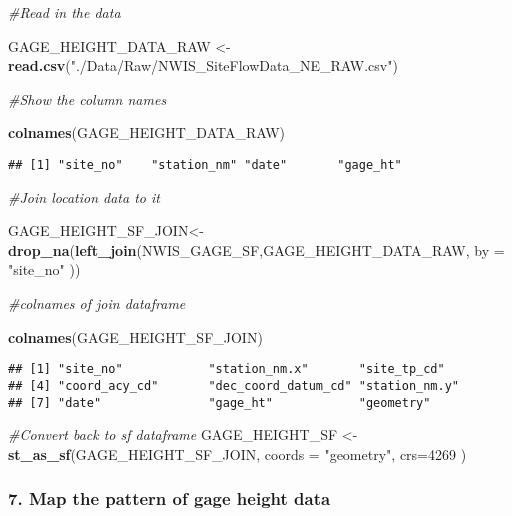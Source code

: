 \documentclass[]{article}
\newenvironment{Shaded}{\begin{snugshade}}{\end{snugshade}}
\newcommand{\KeywordTok}[1]{\textcolor[rgb]{0.13,0.29,0.53}{\textbf{#1}}}
\newcommand{\DataTypeTok}[1]{\textcolor[rgb]{0.13,0.29,0.53}{#1}}
\newcommand{\DecValTok}[1]{\textcolor[rgb]{0.00,0.00,0.81}{#1}}
\newcommand{\StringTok}[1]{\textcolor[rgb]{0.31,0.60,0.02}{#1}}
\newcommand{\CommentTok}[1]{\textcolor[rgb]{0.56,0.35,0.01}{\textit{#1}}}
\newcommand{\NormalTok}[1]{#1}
\begin{document}
\begin{Shaded}
\begin{Highlighting}[]
\CommentTok{#Read in the data}

\NormalTok{GAGE_HEIGHT_DATA_RAW <-}\StringTok{ }\KeywordTok{read.csv}\NormalTok{(}\StringTok{"./Data/Raw/NWIS_SiteFlowData_NE_RAW.csv"}\NormalTok{)}

\CommentTok{#Show the column names}

\KeywordTok{colnames}\NormalTok{(GAGE_HEIGHT_DATA_RAW)}
\end{Highlighting}
\end{Shaded}

\begin{verbatim}
## [1] "site_no"    "station_nm" "date"       "gage_ht"
\end{verbatim}

\begin{Shaded}
\begin{Highlighting}[]
\CommentTok{#Join location data to it}

\NormalTok{GAGE_HEIGHT_SF_JOIN<-}\KeywordTok{drop_na}\NormalTok{(}\KeywordTok{left_join}\NormalTok{(NWIS_GAGE_SF,GAGE_HEIGHT_DATA_RAW, }\DataTypeTok{by =} \StringTok{"site_no"}\NormalTok{ ))}

\CommentTok{#colnames of join dataframe}

\KeywordTok{colnames}\NormalTok{(GAGE_HEIGHT_SF_JOIN)}
\end{Highlighting}
\end{Shaded}

\begin{verbatim}
## [1] "site_no"            "station_nm.x"       "site_tp_cd"        
## [4] "coord_acy_cd"       "dec_coord_datum_cd" "station_nm.y"      
## [7] "date"               "gage_ht"            "geometry"
\end{verbatim}

\begin{Shaded}
\begin{Highlighting}[]
\CommentTok{#Convert back to sf dataframe}
\NormalTok{GAGE_HEIGHT_SF <-}\StringTok{ }\KeywordTok{st_as_sf}\NormalTok{(GAGE_HEIGHT_SF_JOIN, }\DataTypeTok{coords =} \StringTok{"geometry"}\NormalTok{, }\DataTypeTok{crs=}\DecValTok{4269}\NormalTok{ )}
\end{Highlighting}
\end{Shaded}

\subsubsection{7. Map the pattern of gage height
data}\label{map-the-pattern-of-gage-height-data}
\end{document}
